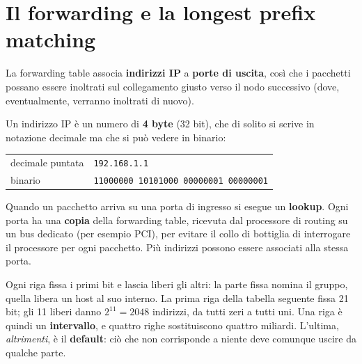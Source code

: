 \section{Il forwarding e la longest prefix matching}

La forwarding table associa \textbf{indirizzi IP} a \textbf{porte di uscita}, così che i pacchetti possano essere
inoltrati sul collegamento giusto verso il nodo successivo (dove, eventualmente, verranno inoltrati di nuovo).

Un indirizzo IP è un numero di \textbf{4 byte} (32 bit), che di solito si scrive in notazione decimale ma che si può
vedere in binario:

\begin{center}
\begin{tabular}{ll}
decimale puntata & \texttt{192.168.1.1} \\
binario & \texttt{11000000 10101000 00000001 00000001} \\
\end{tabular}
\end{center}

Quando un pacchetto arriva su una porta di ingresso si esegue un \textbf{lookup}. Ogni porta ha una
\textbf{copia} della forwarding table, ricevuta dal processore di routing su un bus dedicato (per esempio PCI), per
evitare il collo di bottiglia di interrogare il processore per ogni pacchetto. Più indirizzi possono essere
associati alla stessa porta.


Ogni riga fissa i primi bit e lascia liberi gli altri: la parte fissa nomina il gruppo, quella libera un host al suo
interno. La prima riga della tabella seguente fissa 21 bit; gli 11 liberi danno $2^{11} = 2048$ indirizzi, da tutti zeri
a tutti uni. Una riga è quindi un \textbf{intervallo}, e quattro righe sostituiscono quattro miliardi. L'ultima,
\emph{altrimenti}, è il \textbf{default}: ciò che non corrisponde a niente deve comunque uscire da qualche parte.

